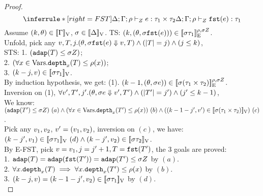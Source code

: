 \documentclass[a4paper,11pt]{article}
\theoremstyle{definition}
\begin{document}
\begin{proof}
\[
    \inferrule*[right = FST]{
      \Delta; \Gamma; \dmap \tvdash{\nnatA} \expr: \type_1 \times \type_2
    }{
      \Delta; \Gamma; \dmap \tvdash{\nnatA} \eprojl(\expr): \type_1
    }
\]
Assume $(k, \theta) \in [\![ \Gamma ]\!]_{\text{V}}$, $ \sigma \in [\![ \Delta ]\!]_{\text{V}}$.
%
TS: $( k, (\theta, \sigma \mathtt{fst}(e)) ) \in [\![ \sigma \tau_1 ]\!]_{\text{E}}^{\rho, \sigma Z} $.\\
%
Unfold, pick any $ v, T, j. (\theta, \sigma \mathtt{fst}(e)   \mathrel{\Downarrow} v, T) \land (|T| = j) \land (j \leq k) $,\\
%
STS: 
1. $ (\mathtt{adap}(T) \leq \sigma Z) $;\\
%
2. $ (\forall x \in \mbox{Vars}. \mathtt{depth}_{x}(T) \leq \rho(x)) $;\\
%
3. $ (k - j, v) \in [\![ \sigma \tau_1 ]\!]_{\text{V}} $.\\
%
By induction hypothesis, we get:
%
(1). $(k-1, (\theta, \sigma e)) \in [\![ \sigma (\tau_1 \times \tau_2) ]\!]_{\text{E}}^{\rho, \sigma Z}$.\\
%
Inversion on (1), $ \forall v', T', j'. (\theta, \sigma e \mathrel{\Downarrow} v', T') \land (|T'| = j') \land (j' \leq k-1) $,\\
%
We know: $(\adap(\tr') \leq \ienv \nnatA) ~ (a)
% 
\land (\forall x \in \mbox{Vars}. \ddep{x}(\tr') \leq \dmap(x)) ~ (b)
%
\land ((\stepiA -1 - j', \valr') \in \lrv{\ienv (\type_1 \times \type_2)}) ~ (c)$.\\
%
Pick any $v_1, v_2$, $v' = (v_1, v_2)$,
%
inversion on $(c)$, we have:\\
%
$(k - j', v_1) \in [\![ \sigma \tau_1 ]\!]_{\text{V}}~(d) \land (k - j', v_2) \in [\![ \sigma \tau_2 ]\!]_{\text{V}}$.\\
%
By E-FST, pick $v = v_1, j = j'+1, T = \mathtt{fst}(T')$, the 3 goals are proved:\\
%
1. $\mathtt{adap}(T) = \mathtt{adap}(\mathtt{fst}(T')) = \mathtt{adap}(T') \leq \sigma Z$ by $(a)$.\\
%
2. $\forall x .\mathtt{depth}_{x}(T) \implies \forall x . \mathtt{depth}_{x}(T') \leq \rho(x)$ by $(b)$.\\
%
3. $(k - j, v) = (k -1- j', v_2) \in
[\![ \sigma \tau_1 ]\!]_{\text{V}}$ by $(d)$.
\\





\end{proof}
\end{document}
